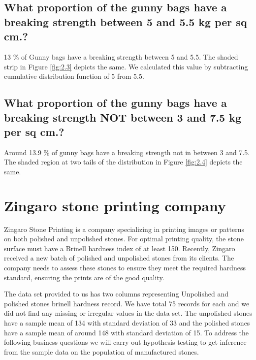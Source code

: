 \documentclass[12pt,a4paper]{style}
\begin{document}
	\subsection{What proportion of the gunny bags have a breaking strength between 5 and 5.5 kg per sq cm.?} 13 \% of Gunny bags have a breaking strength between 5 and 5.5. The shaded strip in Figure \ref{fig:2.3} depicts the same. We calculated this value by subtracting cumulative distribution function of 5 from 5.5. 
	\subsection{What proportion of the gunny bags have a breaking strength NOT between 3 and 7.5 kg per sq cm.?}
	Around 13.9 \% of gunny bags have a breaking strength not in between 3 and 7.5. The shaded region at two tails of the distribution in Figure \ref{fig:2.4} depicts the same.
	
	\section{Zingaro stone printing company}Zingaro Stone Printing is a company specializing in printing images or patterns on both polished and unpolished stones. For optimal printing quality, the stone surface must have a Brinell hardness index of at least 150. Recently, Zingaro received a new batch of polished and unpolished stones from its clients. The company needs to assess these stones to ensure they meet the required hardness standard, ensuring the prints are of the good quality.
	
	The data set provided to us has two columns representing Unpolished and polished stones brinell hardness record. We have total 75 records for each and we did not find any missing or irregular values in the data set. The unpolished stones have a sample mean of 134 with standard deviation of 33 and the polished stones have a sample mean of around 148 with standard deviation of 15. To address the following business questions we will carry out hypothesis testing to get inference from the sample data on the population of manufactured stones. 
\end{document}
